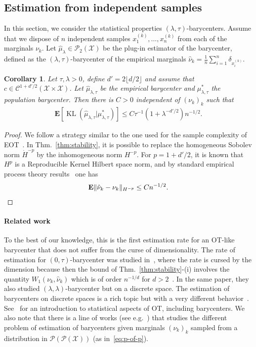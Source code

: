 \documentclass[11pt]{article}
\newcommand{\Cc}{\mathcal{C}}
\newcommand{\Pp}{\mathcal{P}}
\newcommand{\Xx}{\mathcal{X}}
\newcommand{\E}{\mathbf{E}}
\DeclareMathOperator{\KL}{KL}
\newtheorem{corollary}[theorem]{Corollary}
\begin{document}
\subsection{Estimation from independent samples}
In this section, we consider the statistical properties $(\lambda,\tau)$-barycenters. Assume that we dispose of $n$ independent samples $x^{(k)}_1,\dots, x^{(k)}_n$ from each of the marginals $\nu_k$. Let $\hat \mu_\lambda\in \Pp_2(\Xx)$ be the plug-in estimator of the barycenter, defined as the $(\lambda,\tau)$-barycenter of the empirical marginals $\hat \nu_k = \frac1n \sum_{i=1}^n \delta_{x_i^{(k)}}$. 


\begin{corollary}
Let $\tau,\lambda>0$, define $d'=2\lfloor d/2\rfloor$ and assume that $c\in \Cc^{1+d'/2}(\Xx\times \Xx)$. Let $\hat \mu_{\lambda,\tau}$ be the empirical barycenter and $\mu^*_{\lambda,\tau}$ the population barycenter. Then there is $C>0$ independent of $(\nu_k)_k$ such that 
\begin{align*}
\E [\KL(\hat \mu_{\lambda,\tau}|\mu^*_{\lambda,\tau})]\leq C \tau^{-1}(1+\lambda^{-d'/2})n^{-1/2}.
\end{align*}
\end{corollary}
\begin{proof}
We follow a strategy similar to the one used for the sample complexity of EOT~\cite{genevay2019sample}. In Thm.~\ref{thm:stability}, it is possible to replace the homogeneous Sobolev norm $\dot H^{-p}$ by the inhomogeneous norm $H^{-p}$. For $p=1+d'/2$, it is known that $H^{p}$ is a Reproducible Kernel Hilbert space norm, and by standard empirical process theory results~\cite{bartlett2002rademacher} one has 
\begin{equation*}
\E \Vert \hat \nu_k -\nu_k\Vert_{H^{-p}} \leq C n^{-1/2}. \qedhere
\end{equation*}
\end{proof}

\paragraph{Related work} To the best of our knowledge, this is the first estimation rate for an OT-like barycenter that does not suffer from the curse of dimensionality. The rate of estimation for $(0,\tau)$-barycenter was studied in~\cite{bigot2020statistical}, where the rate is cursed by the dimension because then the bound of Thm.~\ref{thm:stability}-(i) involves the quantity $W_1(\nu_k,\hat \nu_k)$ which is of order $n^{-1/d}$ for $d>2$~\cite{fournier2015rate}. In the same paper, they also studied $(\lambda,\lambda)$-barycenter but on a discrete space. The estimation of barycenters on discrete spaces is a rich topic but with a very different behavior~\cite{heinemann2023kantorovich, heinemann2022randomized}. See~\cite{panaretos2019statistical} for an introduction to statistical aspects of OT, including barycenters. We also note that there is a line of works (see e.g.~\cite{ahidar2020convergence, le2022fast}) that studies the different problem of estimation of barycenters given marginals $(\nu_k)_k$ sampled from a distribution in $\Pp(\Pp(\Xx))$ (as in~\eqref{eq:p-of-p}).
\end{document}
